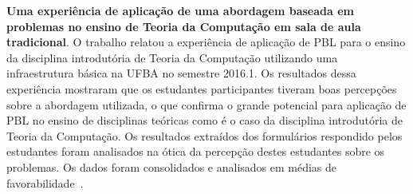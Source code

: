 \item{\textbf{Uma experiência de aplicação de uma
abordagem baseada em problemas no ensino
de Teoria da Computação em sala de aula tradicional}.
O trabalho relatou a experiência de aplicação de \ac{PBL}
para o ensino da disciplina introdutória de Teoria da
Computação utilizando uma infraestrutura básica na
\ac{UFBA} no semestre 2016.1.
Os resultados dessa experiência mostraram que os estudantes participantes
tiveram boas percepções sobre a abordagem utilizada, o que confirma o
grande potencial para aplicação de \ac{PBL} no ensino de
disciplinas teóricas como é o caso da disciplina introdutória de
Teoria da Computação.
Os resultados extraídos dos formulários respondido pelos estudantes
foram analisados na ótica da percepção
destes estudantes sobre os problemas.
Os dados foram consolidados e analisados em médias
de favorabilidade~\cite{gavaza2017}.}

